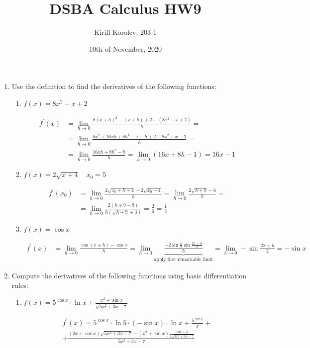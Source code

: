 \documentclass{article}
\title{DSBA Calculus HW9}
\author{Kirill Korolev, 203-1}
\date{10th of November, 2020}
\begin{document}
	
\maketitle

\begin{enumerate}
\item Use the definition to find the derivatives of the following functions:

\begin{enumerate}
\item $f(x) = 8x^2 - x + 2$

\begin{align*}
f^\prime(x)&=\lim_{h \to 0} \frac{8(x+h)^2-(x+h)+2-(8x^2-x+2)}{h}=\\
&=\lim_{h \to 0} \frac{8x^2+16xh+8h^2-x-h+2-8x^2+x-2}{h}=\\
&=\lim_{h \to 0} \frac{16xh+8h^2-h}{h}=\lim_{h \to 0} (16x+8h-1)=16x-1
\end{align*}

\item $f(x) = 2\sqrt{x+4} \quad x_0=5$

\begin{align*}
f^\prime(x_0)&=\lim_{h \to 0} \frac{2\sqrt{x_0+h+4}-2\sqrt{x_0+4}}{h}=\lim_{h \to 0} \frac{2\sqrt{h+9}-6}{h}=\\
&=\lim_{h \to 0} \frac{2(h+9-9)}{h(\sqrt{h+9}+3)}=\frac{2}{6}=\frac{1}{3}
\end{align*}

\item $f(x)=\cos{x}$

\begin{align*}
f^\prime(x)&=\lim_{h \to 0} \frac{\cos{(x+h)}-\cos{x}}{h}=\lim_{h \to 0} \underbrace{\frac{-2\sin{\frac{h}{2}}\sin{\frac{2x+h}{2}}}{h}}_{\text{apply first remarkable limit}}=\lim_{h \to 0} -\sin{\frac{2x+h}{2}}=-\sin{x}
\end{align*}

\end{enumerate}

\item Compute the derivatives of the following functions using basic differentiation rules:
\begin{enumerate}
\item $f(x)=5^{\cos{x}} \cdot \ln{x} + \frac{x^2+\sin{x}}{\sqrt{5x^2+3x-7}}$

\begin{align*}
f^\prime(x)=5^{\cos{x}} \cdot \ln{5} \cdot (-\sin{x}) \cdot \ln{x} + \frac{5^{\cos{x}}}{x} +\\
+\frac{(2x+\cos{x})\sqrt{5x^2+3x-7}-(x^2+\sin{x})\frac{10x+3}{2\sqrt{5x^2+3x-7}}}{5x^2+3x-7}
\end{align*}
\end{enumerate}

\end{enumerate}
\end{document}
